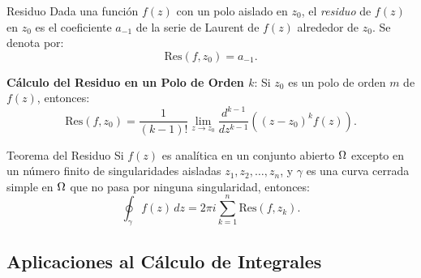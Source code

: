 \documentclass[main.tex]{subfiles}
\begin{document}
\begin{def.}{Residuo}
Dada una función \(f(z)\) con un polo aislado en \(z_0\), el \emph{residuo} de \(f(z)\) en \(z_0\) es el coeficiente \(a_{-1}\) de la serie de Laurent de \(f(z)\) alrededor de \(z_0\). Se denota por:
\[
\text{Res}(f, z_0) = a_{-1}.
\]
\end{def.}
\noindent\textbf{Cálculo del Residuo en un Polo de Orden \(k\)}:
Si \(z_0\) es un polo de orden \(m\) de \(f(z)\), entonces:
\[
\text{Res}(f, z_0) = \frac{1}{(k-1)!} \lim_{z \to z_0} \frac{d^{k-1}}{dz^{k-1}} \left( (z - z_0)^k f(z) \right).
\]

\begin{teorema}{Teorema del Residuo}
Si \(f(z)\) es analítica en un conjunto abierto \(\Omega\) excepto en un número finito de singularidades aisladas \(z_1, z_2, \dots, z_n\), y \(\gamma\) es una curva cerrada simple en \(\Omega\) que no pasa por ninguna singularidad, entonces:
\[
\oint_\gamma f(z) \, dz = 2\pi i \sum_{k=1}^n \text{Res}(f, z_k).
\]
\end{teorema}

\subsection{Aplicaciones al Cálculo de Integrales}
\end{document}
